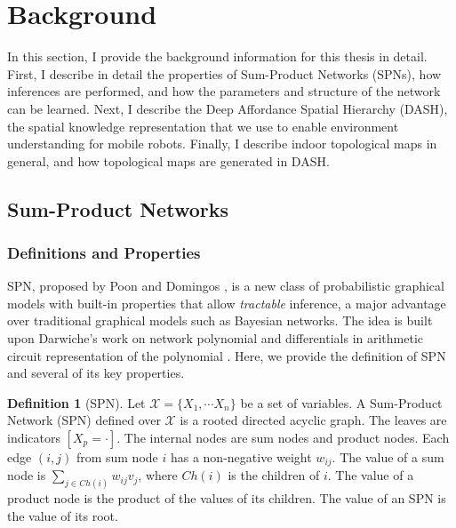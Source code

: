 \documentclass[10pt, titlepage]{article}
\theoremstyle{definition}
\newtheorem{definition}{Definition}[section]
\begin{document}
\newpage
\section{Background}\label{section:background}

In this section, I provide the background information for this thesis in detail. First, I describe in detail the properties of Sum-Product Networks (SPNs), how inferences are performed, and how the parameters and structure of the network can be learned. Next, I describe the Deep Affordance Spatial Hierarchy (DASH), the spatial knowledge representation that we use to enable environment understanding for mobile robots. Finally, I describe indoor topological maps in general, and how topological maps are generated in DASH.

\subsection{Sum-Product Networks}\label{section:spn}

\subsubsection{Definitions and Properties}

SPN, proposed by Poon and Domingos \cite{poon2011sum}, is a new class of probabilistic graphical models with built-in properties that allow \textit{tractable} inference, a major advantage over traditional graphical models such as Bayesian networks. The idea is built upon Darwiche's work on network polynomial and differentials in arithmetic circuit representation of the polynomial \cite{darwiche2003differential}. Here, we provide the definition of SPN and several of its key properties.

\begin{definition}[SPN]
\cite{poon2011sum}
Let $\mathcal{X}=\{X_1,\cdots X_n\}$ be a set of variables. A Sum-Product Network (SPN) defined over $\mathcal{X}$ is a rooted directed acyclic graph. The leaves are indicators $[X_p= \cdot ]$. The internal nodes are sum nodes and product nodes. Each edge $(i,j)$ from sum node $i$ has a non-negative weight $w_{ij}$. The value of a sum node is $\sum_{j\in Ch(i)}w_{ij}v_j$, where $Ch(i)$ is the children of $i$. The value of a product node is the product of the values of its children. The value of an SPN is the value of its root.
\end{definition}
\end{document}
